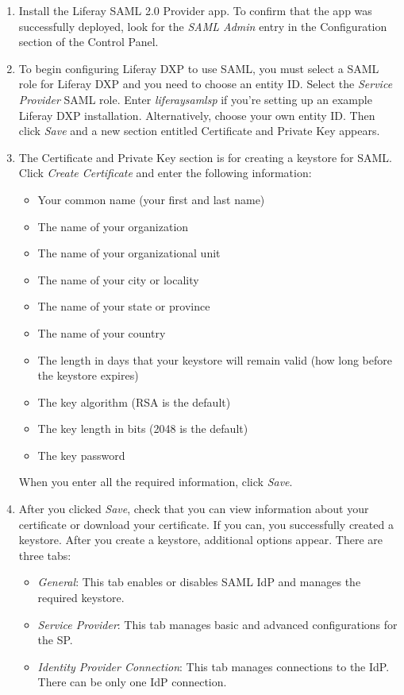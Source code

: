 \noindent\hrulefill

\begin{enumerate}
\def\labelenumi{\arabic{enumi}.}
\item
  Install the Liferay SAML 2.0 Provider app. To confirm that the app was
  successfully deployed, look for the \emph{SAML Admin} entry in the
  Configuration section of the Control Panel.
\item
  To begin configuring Liferay DXP to use SAML, you must select a SAML
  role for Liferay DXP and you need to choose an entity ID. Select the
  \emph{Service Provider} SAML role. Enter \emph{liferaysamlsp} if
  you're setting up an example Liferay DXP installation. Alternatively,
  choose your own entity ID. Then click \emph{Save} and a new section
  entitled Certificate and Private Key appears.
\item
  The Certificate and Private Key section is for creating a keystore for
  SAML. Click \emph{Create Certificate} and enter the following
  information:

  \begin{itemize}
  \tightlist
  \item
    Your common name (your first and last name)
  \item
    The name of your organization
  \item
    The name of your organizational unit
  \item
    The name of your city or locality
  \item
    The name of your state or province
  \item
    The name of your country
  \item
    The length in days that your keystore will remain valid (how long
    before the keystore expires)
  \item
    The key algorithm (RSA is the default)
  \item
    The key length in bits (2048 is the default)
  \item
    The key password
  \end{itemize}

  When you enter all the required information, click \emph{Save}.
\item
  After you clicked \emph{Save}, check that you can view information
  about your certificate or download your certificate. If you can, you
  successfully created a keystore. After you create a keystore,
  additional options appear. There are three tabs:

  \begin{itemize}
  \item
    \emph{General}: This tab enables or disables SAML IdP and manages
    the required keystore.
  \item
    \emph{Service Provider}: This tab manages basic and advanced
    configurations for the SP.
  \item
    \emph{Identity Provider Connection}: This tab manages connections to
    the IdP. There can be only one IdP connection.
  \end{itemize}


\end{enumerate}
